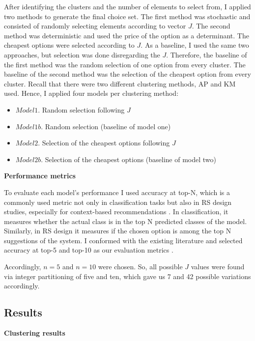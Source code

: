 \documentclass[a4paper,12pt]{article}
\begin{document}
After identifying the clusters and the number of elements to select from, I applied two methods to generate the final choice set. The first method was stochastic and consisted of randomly selecting elements according to vector $J$. The second method was deterministic and used the price of the option as a determinant. The cheapest options were selected according to $J$. As a baseline, I used the same two approaches, but selection was done disregarding the $J$. Therefore, the baseline of the first method was the random selection of one option from every cluster. The baseline of the second method was the selection of the cheapest option from every cluster. Recall that there were two different clustering methods, AP and KM used. Hence, I applied four models per clustering method:

\begin{itemize}
    \item $Model 1$. Random selection following $J$
    \item $Model 1b$. Random selection (baseline of model one)
    \item $Model 2$. Selection of the cheapest options following $J$
    \item $Model 2b$. Selection of the cheapest options (baseline of model two)
\end{itemize}

\textbf{Performance metrics}

To evaluate each model's performance I used accuracy at top-N, which is a commonly used metric not only in classification tasks but also in RS design studies, especially for context-based recommendations \citep{ricci2010recsystems}. In classification, it measures whether the actual class is in the top N predicted classes of the model. Similarly, in RS design it measures if the chosen option is among the top N suggestions of the system. I conformed with the existing literature and selected accuracy at top-5 and top-10 as our evaluation metrics \cite{cremonesi2010performance}. 

Accordingly,  $n = 5$ and $n = 10$ were chosen. So, all possible $J$ values were found via integer partitioning of five and ten, which gave us 7 and 42 possible variations accordingly.

\subsection{Results}

\textbf{Clustering results}
    
\end{document}
